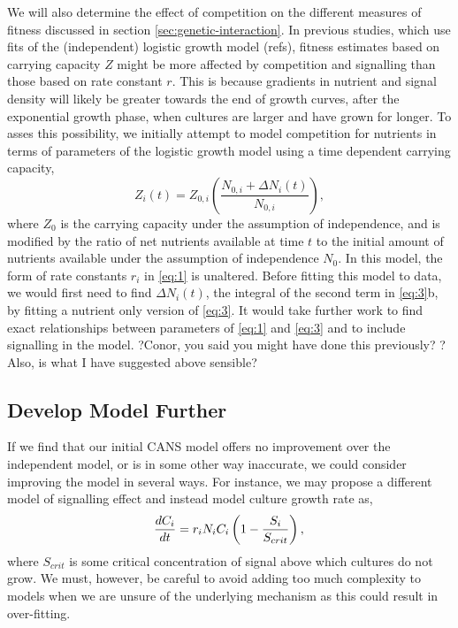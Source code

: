 We will also determine the effect of competition on the different
measures of fitness discussed in section
\ref{sec:genetic-interaction}. In previous studies, which use fits of
the (independent) logistic growth model (refs), fitness estimates
based on carrying capacity \(Z\) might be more affected by competition
and signalling than those based on rate constant \(r\). This is
because gradients in nutrient and signal density will likely be
greater towards the end of growth curves, after the exponential growth
phase, when cultures are larger and have grown for longer. To asses
this possibility, we initially attempt to model competition for
nutrients in terms of parameters of the logistic growth model using a
time dependent carrying capacity,
\begin{equation}
  \label{eq:5}
  Z_{i}(t) = Z_{0,i}\left(\frac{N_{0,i} + \Delta N_{i}(t)}{N_{0,i}}\right),
\end{equation}
where \(Z_{0}\) is the carrying capacity under the assumption of
independence, and is modified by the ratio of net nutrients available
at time \(t\) to the initial amount of nutrients available under the
assumption of independence \(N_{0}\). In this model, the form of rate
constants \(r_{i}\) in \ref{eq:1} is unaltered. Before fitting this
model to data, we would first need to find \(\Delta N_{i}(t)\), the
integral of the second term in \ref{eq:3}b, by fitting a nutrient only
version of \ref{eq:3}. It would take further work to find exact
relationships between parameters of \ref{eq:1} and \ref{eq:3} and to
include signalling in the model. ?Conor,
you said you might have done this previously?  ?Also, is what I have
suggested above sensible?


\subsection{Develop Model Further}
\label{sec:dev-mod-further}
If we find that our initial CANS model offers no improvement over the
independent model, or is in some other way inaccurate, we could
consider improving the model in several ways. For instance, we may
propose a different model of signalling effect and instead model
culture growth rate as,
\begin{equation}
  \label{eq:6}
  \frac{dC_{i}}{dt} = r_{i}N_{i}C_{i}\left(1 - \frac{S_{i}}{S_{crit}}\right),\\
\end{equation}
where \(S_{crit}\) is some critical concentration of signal above
which cultures do not grow. We must, however, be careful to avoid
adding too much complexity to models when we are unsure of the
underlying mechanism as this could result in over-fitting.

